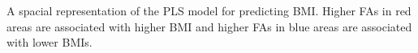 \label{fa_effect_map} A spacial representation of the PLS model for predicting BMI. Higher FAs in red areas are associated with higher BMI and higher FAs in blue areas are associated with lower BMIs.